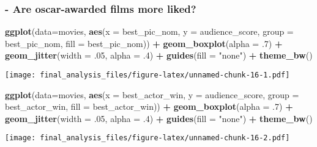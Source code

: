 \documentclass[]{article}
\newenvironment{Shaded}{\begin{snugshade}}{\end{snugshade}}
\newcommand{\DataTypeTok}[1]{\textcolor[rgb]{0.13,0.29,0.53}{#1}}
\newcommand{\FloatTok}[1]{\textcolor[rgb]{0.00,0.00,0.81}{#1}}
\newcommand{\KeywordTok}[1]{\textcolor[rgb]{0.13,0.29,0.53}{\textbf{#1}}}
\newcommand{\NormalTok}[1]{#1}
\newcommand{\OperatorTok}[1]{\textcolor[rgb]{0.81,0.36,0.00}{\textbf{#1}}}
\newcommand{\StringTok}[1]{\textcolor[rgb]{0.31,0.60,0.02}{#1}}
\begin{document}
\hypertarget{are-oscar-awarded-films-more-liked}{%
\subsubsection{- Are oscar-awarded films more
liked?}\label{are-oscar-awarded-films-more-liked}}

\begin{Shaded}
\begin{Highlighting}[]
\KeywordTok{ggplot}\NormalTok{(}\DataTypeTok{data=}\NormalTok{movies, }\KeywordTok{aes}\NormalTok{(}\DataTypeTok{x =}\NormalTok{ best_pic_nom, }\DataTypeTok{y =}\NormalTok{ audience_score, }\DataTypeTok{group =}\NormalTok{ best_pic_nom, }\DataTypeTok{fill =}\NormalTok{ best_pic_nom)) }\OperatorTok{+}\StringTok{ }\KeywordTok{geom_boxplot}\NormalTok{(}\DataTypeTok{alpha =} \FloatTok{.7}\NormalTok{) }\OperatorTok{+}\StringTok{ }\KeywordTok{geom_jitter}\NormalTok{(}\DataTypeTok{width =} \FloatTok{.05}\NormalTok{, }\DataTypeTok{alpha =} \FloatTok{.4}\NormalTok{) }\OperatorTok{+}\StringTok{ }\KeywordTok{guides}\NormalTok{(}\DataTypeTok{fill =} \StringTok{"none"}\NormalTok{) }\OperatorTok{+}\StringTok{ }\KeywordTok{theme_bw}\NormalTok{()}
\end{Highlighting}
\end{Shaded}

\texttt{[image: final\_analysis\_files/figure-latex/unnamed-chunk-16-1.pdf]}

\begin{Shaded}
\begin{Highlighting}[]
\KeywordTok{ggplot}\NormalTok{(}\DataTypeTok{data=}\NormalTok{movies, }\KeywordTok{aes}\NormalTok{(}\DataTypeTok{x =}\NormalTok{ best_actor_win, }\DataTypeTok{y =}\NormalTok{ audience_score, }\DataTypeTok{group =}\NormalTok{ best_actor_win, }\DataTypeTok{fill =}\NormalTok{ best_actor_win)) }\OperatorTok{+}\StringTok{ }\KeywordTok{geom_boxplot}\NormalTok{(}\DataTypeTok{alpha =} \FloatTok{.7}\NormalTok{) }\OperatorTok{+}\StringTok{ }\KeywordTok{geom_jitter}\NormalTok{(}\DataTypeTok{width =} \FloatTok{.05}\NormalTok{, }\DataTypeTok{alpha =} \FloatTok{.4}\NormalTok{) }\OperatorTok{+}\StringTok{ }\KeywordTok{guides}\NormalTok{(}\DataTypeTok{fill =} \StringTok{"none"}\NormalTok{) }\OperatorTok{+}\StringTok{ }\KeywordTok{theme_bw}\NormalTok{()}
\end{Highlighting}
\end{Shaded}

\texttt{[image: final\_analysis\_files/figure-latex/unnamed-chunk-16-2.pdf]}
\end{document}

